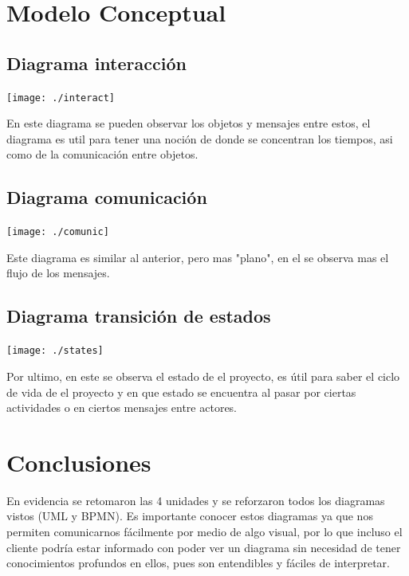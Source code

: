 \documentclass[spanish,12pt,letterpapper]{article}
\begin{document}
	\section{Modelo Conceptual\\}
	
	\subsection{Diagrama interacción}
	\begin{center}
	\texttt{[image: ./interact]}~\\[1cm]
	\end{center}
	En este diagrama se pueden observar los objetos y mensajes entre estos, el diagrama es util para tener una noción de donde se concentran los tiempos, asi como de la comunicación entre objetos.
	\subsection{Diagrama comunicación}
	\begin{center}
	\texttt{[image: ./comunic]}~\\[1cm]
	\end{center}
	Este diagrama es similar al anterior, pero mas "plano", en el se observa mas el flujo de los mensajes.
	\subsection{Diagrama transición de estados}
	\begin{center}
	\texttt{[image: ./states]}~\\[1cm]
	\end{center}
	Por ultimo, en este se observa el estado de el proyecto, es útil para saber el ciclo de vida de el proyecto y en que estado se encuentra al pasar por ciertas actividades o en ciertos mensajes entre actores.
	
	\section{Conclusiones}
	En evidencia se retomaron las 4 unidades y se reforzaron todos los diagramas vistos (UML y BPMN). Es importante conocer estos diagramas ya que nos permiten comunicarnos fácilmente por medio de algo visual, por lo que incluso el cliente podría estar informado con poder ver un diagrama sin necesidad de tener conocimientos profundos en ellos, pues son entendibles y fáciles de interpretar.\\
	
\end{document}
